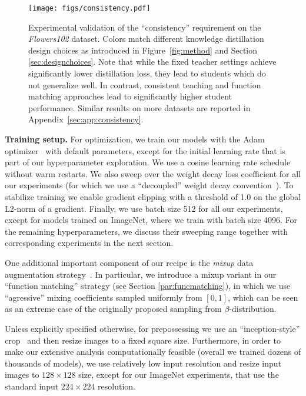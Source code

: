 \documentclass[10pt,twocolumn,letterpaper]{article}
\begin{document}
\begin{figure*}[t]\centering
    \texttt{[image: figs/consistency.pdf]}\caption{Experimental validation of the ``consistency'' requirement on the \emph{Flowers102} dataset. Colors match different knowledge distillation design choices as introduced in Figure~\ref{fig:method} and Section \ref{sec:designchoices}. Note that while the \textcolor{fixedcolor}{fixed teacher} settings achieve significantly lower distillation loss, they lead to students which do not generalize  well. In contrast, \textcolor{consicolor}{consistent teaching} and \textcolor{fnmatcolor}{function matching} approaches lead to significantly higher student performance. Similar results on more datasets are reported in Appendix~\ref{sec:app:consistency}.}\label{fig:consistency}\end{figure*}

\textbf{Training setup.} For optimization, we train our models with the Adam optimizer~\cite{adam} with default parameters, except for the initial learning rate that is part of our hyperparameter exploration. 
We use a cosine learning rate schedule~\cite{loshchilov2016sgdr} without warm restarts. 
We also sweep over the weight decay loss coefficient for all our experiments (for which we use a ``decoupled'' weight decay convention~\cite{loshchilov2017decoupled}).
To stabilize training we enable gradient clipping with a threshold of 1.0 on the global L2-norm of a gradient. Finally, we use batch size 512 for all our experiments, except for models trained on ImageNet, where we train with  batch size 4096.
For the remaining hyperparameters, we discuss their sweeping range together with corresponding experiments in the next section.

One additional important component of our recipe is the  \emph{mixup} data augmentation strategy~\cite{zhang2018mixup}.
In particular, we introduce a mixup variant in our ``function matching'' strategy (see Section \ref{par:funcmatching}), in which we 
use ``agressive'' mixing coefficients sampled uniformly from $[0, 1]$, which can be seen as an extreme case of 
the originally proposed sampling from $\beta$-distribution.
  
Unless explicitly specified otherwise, for prepossessing we use an ``inception-style'' crop~\cite{szegedy2015going} and then resize images to a fixed square size. 
Furthermore, in order to make our extensive analysis computationally feasible (overall we trained dozens of thousands of models), we use relatively low input resolution and resize input images to $128 \times 128$ size, except for our ImageNet experiments, that use the standard input $224 \times 224$ resolution.
\end{document}
